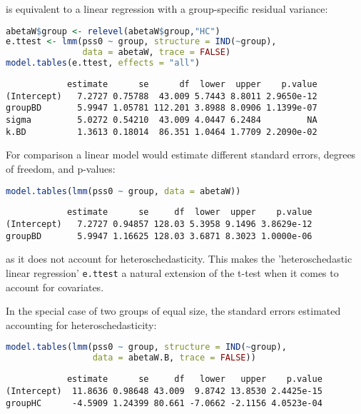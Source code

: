 \documentclass[12pt]{article}
\begin{document}
is equivalent to a linear regression with a group-specific residual
variance:
\begin{lstlisting}[language=r,numbers=none]
abetaW$group <- relevel(abetaW$group,"HC")
e.ttest <- lmm(pss0 ~ group, structure = IND(~group), 
               data = abetaW, trace = FALSE)
model.tables(e.ttest, effects = "all")
\end{lstlisting}

\label{}
\begin{verbatim}
            estimate      se      df  lower  upper    p.value
(Intercept)   7.2727 0.75788  43.009 5.7443 8.8011 2.9650e-12
groupBD       5.9947 1.05781 112.201 3.8988 8.0906 1.1399e-07
sigma         5.0272 0.54210  43.009 4.0447 6.2484         NA
k.BD          1.3613 0.18014  86.351 1.0464 1.7709 2.2090e-02
\end{verbatim}


\noindent For comparison a linear model would estimate different standard
errors, degrees of freedom, and p-values:
\begin{lstlisting}[language=r,numbers=none]
model.tables(lmm(pss0 ~ group, data = abetaW))
\end{lstlisting}

\label{}
\begin{verbatim}
            estimate      se     df  lower  upper    p.value
(Intercept)   7.2727 0.94857 128.03 5.3958 9.1496 3.8629e-12
groupBD       5.9947 1.16625 128.03 3.6871 8.3023 1.0000e-06
\end{verbatim}


as it does not account for heteroschedasticity. This makes the
'heteroschedastic linear regression' \texttt{e.ttest} a natural extension of
the t-test when it comes to account for covariates.

\clearpage

In the special case of two groups of equal size, the standard errors
estimated accounting for heteroschedasticity:
\begin{lstlisting}[language=r,numbers=none]
model.tables(lmm(pss0 ~ group, structure = IND(~group), 
                 data = abetaW.B, trace = FALSE))
\end{lstlisting}

\label{}
\begin{verbatim}
            estimate      se     df   lower   upper    p.value
(Intercept)  11.8636 0.98648 43.009  9.8742 13.8530 2.4425e-15
groupHC      -4.5909 1.24399 80.661 -7.0662 -2.1156 4.0523e-04
\end{verbatim}
\end{document}

